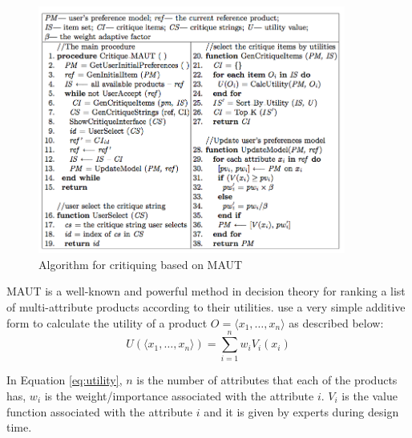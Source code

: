 \begin{figure}
  \centering
    \includegraphics[width=0.9\textwidth]{figures-bharath/paperAlgo.png}
  \caption{Algorithm for critiquing based on MAUT}
\label{fig:paperAlgo}
\end{figure}

MAUT is a well-known  and powerful method in decision theory for ranking a list of multi-attribute products according to their utilities.
\cite{mautPaper} use a very simple additive form to calculate the utility of a product $O = \langle x_1,\hdots,x_n\rangle$ as described below:
\begin{equation}
\label{eq:utility}
U(\langle x_1,\hdots,x_n \rangle) = \sum_{i=1}^n w_iV_i(x_i)
\end{equation}

In Equation \ref{eq:utility}, $n$ is the number of attributes that each of the products has, $w_i$ is the weight/importance associated with the attribute $i$. 
$V_i$ is the value function associated with the attribute $i$ and it is given by experts during design time.







